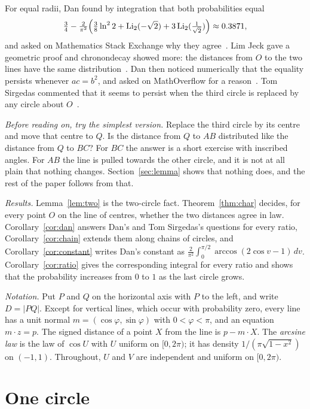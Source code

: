 \documentclass[11pt]{amsart}
\theoremstyle{remark}
\begin{document}
For equal radii, Dan found by integration that both probabilities equal
\[
\tfrac34-\tfrac{2}{\pi^2}\Bigl(\tfrac38\ln^2 2+\operatorname{Li}_2(-\sqrt2)+3\operatorname{Li}_2(\tfrac{1}{\sqrt2})\Bigr)\approx 0.3871,
\]
and asked on Mathematics Stack Exchange why they agree~\cite{MSE}. Lim Jeck gave a geometric proof and chronondecay showed more: the distances from $O$ to the two lines have the same distribution~\cite{MSE}. Dan then noticed numerically that the equality persists whenever $ac=b^2$, and asked on MathOverflow for a reason~\cite{MO}. Tom Sirgedas commented that it seems to persist when the third circle is replaced by any circle about $O$~\cite{MO}.

\emph{Before reading on, try the simplest version.} Replace the third circle by its centre and move that centre to $Q$. Is the distance from $Q$ to $AB$ distributed like the distance from $Q$ to $BC$? For $BC$ the answer is a short exercise with inscribed angles. For $AB$ the line is pulled towards the other circle, and it is not at all plain that nothing changes. Section~\ref{sec:lemma} shows that nothing does, and the rest of the paper follows from that.

\emph{Results.} Lemma~\ref{lem:two} is the two-circle fact. Theorem~\ref{thm:char} decides, for every point $O$ on the line of centres, whether the two distances agree in law. Corollary~\ref{cor:dan} answers Dan's and Tom Sirgedas's questions for every ratio, Corollary~\ref{cor:chain} extends them along chains of circles, and Corollary~\ref{cor:constant} writes Dan's constant as $\frac{2}{\pi^2}\int_0^{\pi/2}\arccos(2\cos v-1)\,dv$. Corollary~\ref{cor:ratio} gives the corresponding integral for every ratio and shows that the probability increases from $0$ to $1$ as the last circle grows.

\emph{Notation.} Put $P$ and $Q$ on the horizontal axis with $P$ to the left, and write $D=|PQ|$. Except for vertical lines, which occur with probability zero, every line has a unit normal $m=(\cos\varphi,\sin\varphi)$ with $0<\varphi<\pi$, and an equation $m\cdot z=p$. The signed distance of a point $X$ from the line is $p-m\cdot X$. The \emph{arcsine law} is the law of $\cos U$ with $U$ uniform on $[0,2\pi)$; it has density $1/(\pi\sqrt{1-x^2})$ on $(-1,1)$. Throughout, $U$ and $V$ are independent and uniform on $[0,2\pi)$.

\section{One circle}\label{sec:one}
\end{document}
